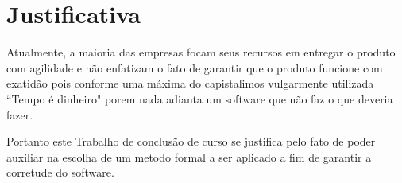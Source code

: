\section{Justificativa}
Atualmente, a maioria das empresas focam seus recursos em entregar o produto com agilidade e não enfatizam o fato de garantir que o produto funcione com exatidão pois conforme uma máxima do capistalimos vulgarmente utilizada “Tempo é dinheiro" porem nada adianta um software que não faz o que deveria fazer.

Portanto este Trabalho de conclusão de curso se justifica pelo fato de poder auxiliar na escolha de um metodo formal a ser aplicado a fim de garantir a corretude do software.